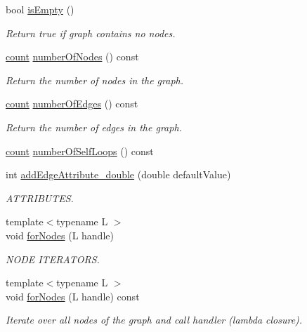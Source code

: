 \begin{DoxyCompactItemize}
bool \hyperlink{class_networ_kit_1_1_graph_a14c01e09942d12db12f3ff6efc8f63aa}{is\-Empty} ()
\begin{DoxyCompactList}\small\item\em Return true if graph contains no nodes. \end{DoxyCompactList}\item 
\hyperlink{namespace_networ_kit_ad4c536a5339a8bf2f91f418b9a67a7d8}{count} \hyperlink{class_networ_kit_1_1_graph_afe664838b6341ceb708f3b42e0871cd8}{number\-Of\-Nodes} () const 
\begin{DoxyCompactList}\small\item\em Return the number of nodes in the graph. \end{DoxyCompactList}\item 
\hyperlink{namespace_networ_kit_ad4c536a5339a8bf2f91f418b9a67a7d8}{count} \hyperlink{class_networ_kit_1_1_graph_a6625b34904eae267ca384c77a081f333}{number\-Of\-Edges} () const 
\begin{DoxyCompactList}\small\item\em Return the number of edges in the graph. \end{DoxyCompactList}\item 
\hyperlink{namespace_networ_kit_ad4c536a5339a8bf2f91f418b9a67a7d8}{count} \hyperlink{class_networ_kit_1_1_graph_a467e6959962dc4600add8832602b5353}{number\-Of\-Self\-Loops} () const 
\item 
int \hyperlink{class_networ_kit_1_1_graph_a465160318e06e6e9b03299dd5774cb04}{add\-Edge\-Attribute\-\_\-double} (double default\-Value)
\begin{DoxyCompactList}\small\item\em A\-T\-T\-R\-I\-B\-U\-T\-E\-S. \end{DoxyCompactList}\item 
{\footnotesize template$<$typename L $>$ }\\void \hyperlink{class_networ_kit_1_1_graph_a56bdf60b5d0b9f11d4211fea53f87e7a}{for\-Nodes} (L handle)
\begin{DoxyCompactList}\small\item\em N\-O\-D\-E I\-T\-E\-R\-A\-T\-O\-R\-S. \end{DoxyCompactList}\item 
{\footnotesize template$<$typename L $>$ }\\void \hyperlink{class_networ_kit_1_1_graph_a078067eec8fdce7f09afd974724a7f66}{for\-Nodes} (L handle) const 
\begin{DoxyCompactList}\small\item\em Iterate over all nodes of the graph and call handler (lambda closure). \end{DoxyCompactList}\item 

\end{DoxyCompactItemize}
